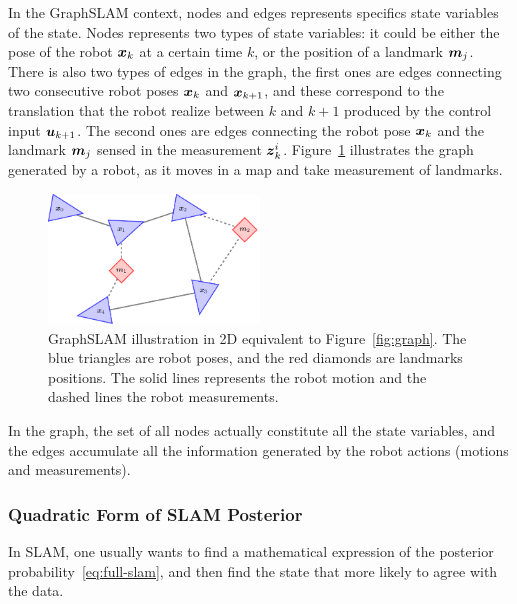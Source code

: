 In the GraphSLAM context, nodes and edges represents specifics state variables of the state. Nodes represents two types of state variables: it could be either the pose of the robot $\boldsymbol{x}_k$ at a certain time $k$, or the position of a landmark $\boldsymbol{m}_j$. There is also two types of edges in the graph, the first ones are edges connecting two consecutive robot poses $\boldsymbol{x}_k$ and $\boldsymbol{x}_{k+1}$, and these correspond to the translation that the robot realize between $k$ and $k+1$ produced by the control input $\boldsymbol{u}_{k+1}$. The second ones are edges connecting the robot pose $\boldsymbol{x}_k$ and the landmark $\boldsymbol{m}_j$ sensed in the measurement $\boldsymbol{z}_k^i$. Figure~\ref{fig:graphslam} illustrates the graph generated by a robot, as it moves in a map and take measurement of landmarks.

\begin{figure}[htbp!]
    \centering
    \includegraphics[width=0.5\textwidth]{tikz/graphslam.pdf}
    \caption[GraphSLAM ilustration in 2D]{GraphSLAM illustration in 2D equivalent to Figure~\ref{fig:graph}. The blue triangles are robot poses, and the red diamonds are landmarks positions. The solid lines represents the robot motion and the dashed lines the robot measurements.}
    \label{fig:graphslam}
\end{figure} 

In the graph, the set of all nodes actually constitute all the state variables, and the edges accumulate all the information generated by the robot actions (motions and measurements).

\subsubsection{Quadratic Form of SLAM Posterior}

In SLAM, one usually wants to find a mathematical expression of the posterior probability~\eqref{eq:full-slam}, and then find the state that more likely to agree with the data.

